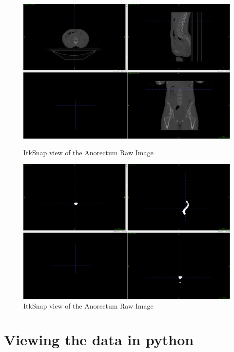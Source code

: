 \documentclass[11pt]{article}
\begin{document}
\begin{figure}[H]
    \centering
    \captionsetup{width=0.45\textwidth}
    \begin{minipage}{.5\textwidth}
        \centering
        \includegraphics[width=\linewidth]{images/AnorectumImage.png}
        \caption{ItkSnap view of the Anorectum Raw Image}\label{fig:AnorectumImage}
    \end{minipage}%
    \begin{minipage}{.5\textwidth}
        \centering
        \includegraphics[width=\linewidth]{images/AnorectumLabel.png}
        \caption{ItkSnap view of the Anorectum Raw Image}\label{fig:AnorectumLabel}
    \end{minipage}%
\end{figure} 

\section{Viewing the data in python}
\end{document}
